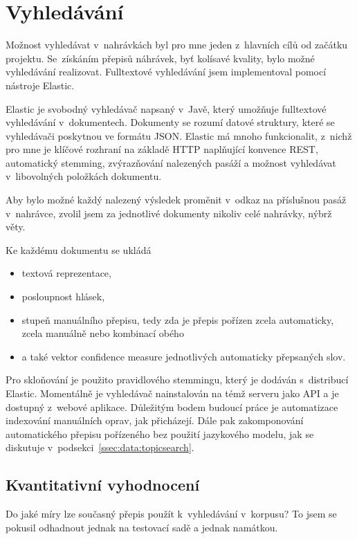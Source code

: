 \chapter{Vyhledávání}
\label{kap:vyhledavani}

Možnost vyhledávat v~nahrávkách byl pro mne jeden z~hlavních cílů od začátku
projektu. Se~získáním přepisů náhrávek, byť kolísavé kvality, bylo možné
vyhledávání realizovat.
Fulltextové vyhledávání jsem implementoval pomocí nástroje Elastic.

Elastic je svobodný vyhledávač napsaný v~Javě, který umožňuje fulltextové
vyhledávání v~dokumentech. Dokumenty se rozumí datové struktury, které se
vyhledávači poskytnou ve formátu JSON. Elastic má mnoho funkcionalit,
z~nichž pro mne je klíčové rozhraní na základě HTTP naplňující konvence REST,
automatický stemming, zvýrazňování nalezených pasáží a možnost vyhledávat
v~libovolných položkách dokumentu.

Aby bylo možné každý nalezený výsledek proměnit v~odkaz na příslušnou pasáž
v~nahrávce, zvolil jsem za jednotlivé dokumenty nikoliv celé nahrávky, nýbrž
věty.

Ke každému dokumentu se ukládá
\begin{itemize}
\item{textová reprezentace,}
\item{posloupnost hlásek,}
\item{stupeň
manuálního přepisu, tedy zda je přepis pořízen zcela automaticky, zcela manuálně
nebo kombinací obého}
\item{a také vektor confidence measure jednotlivých automaticky přepsaných slov.}
\end{itemize}

Pro skloňování je použito pravidlového stemmingu, který je dodáván s~distribucí
Elastic.
Momentálně je vyhledávač nainstalován na témž serveru jako API a je dostupný
z~webové aplikace. Důležitým bodem budoucí práce je automatizace indexování
manuálních oprav, jak přicházejí. Dále pak zakomponování automatického přepisu
pořízeného bez použití jazykového modelu, jak se diskutuje
v~podsekci~\ref{ssec:data:topicsearch}.

\section{Kvantitativní vyhodnocení}

Do jaké míry lze současný přepis použít k~vyhledávání v~korpusu? To jsem se
pokusil odhadnout jednak na testovací sadě a jednak namátkou.

